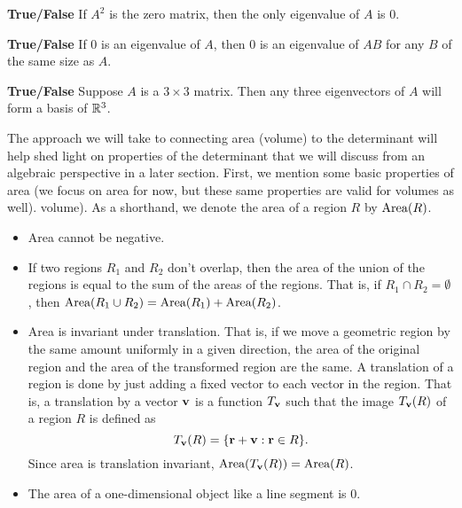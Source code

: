 

\item \textbf{True/False} If $A^2$ is the zero matrix, then the only eigenvalue of $A$ is 0.

\item \textbf{True/False} If 0 is an eigenvalue of $A$, then 0 is an eigenvalue of $AB$ for any $B$ of the same size as $A$.


\item \textbf{True/False} Suppose $A$ is a $3 \times 3$ matrix. Then any three eigenvectors of $A$ will form a basis of $\mathbb{R}^3$.


\ea
\ee


The approach we will take to connecting area (volume) to the determinant will help shed light on properties of the determinant that we will discuss from an algebraic perspective in a later section. First, we mention some basic properties of area (we focus on area for now, but these same properties are valid for volumes as well). volume).  As a shorthand, we denote the area of a region $R$ by $\text{Area}(R)$. 
\begin{itemize}
\item Area cannot be negative.
\item If two regions $R_1$ and $R_2$ don't overlap, then the area of the union of the regions is equal to the sum of the areas of the regions. That is, if $R_1 \cap R_2 = \emptyset$, then $\text{Area}(R_1 \cup R_2) = \text{Area}(R_1) + \text{Area}(R_2)$. 
\item Area is invariant under translation. That is, if we move a geometric region by the same amount uniformly in a given direction, the area of the original region and the area of the transformed region are the same. A translation of a region is done by just adding a fixed vector to each vector in the region. That is, a translation by a vector $\mathbf{v}$ is a function $T_{\mathbf{v}}$ such that the image $T_{\mathbf{v}}(R)$ of a region $R$ is defined as 
\[T_{\mathbf{v}}(R) = \{\mathbf{r}+\mathbf{v} : \mathbf{r} \in R\}.\]
Since area is translation invariant, $\text{Area}(T_{\mathbf{v}}(R)) = \text{Area}(R)$.
\item The area of a one-dimensional object like a line segment is $0$.
\end{itemize}

